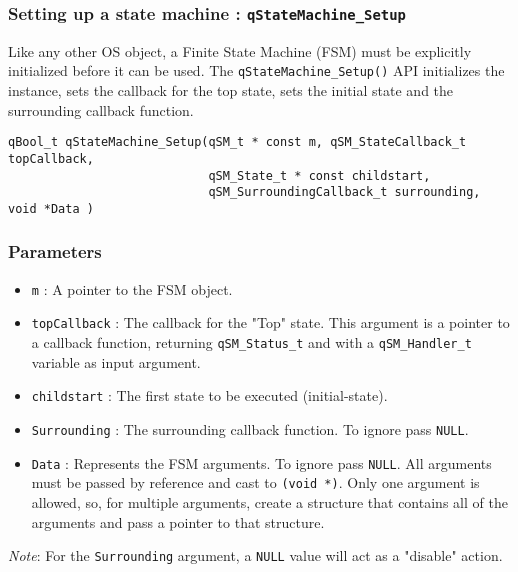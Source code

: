 \subsubsection{Setting up a state machine : \texorpdfstring{\lstinline{qStateMachine_Setup}}{qStateMachine_Setup} }
Like any other OS object, a Finite State Machine (FSM) must be explicitly initialized before it can be used. The \lstinline{qStateMachine_Setup()} API   initializes the instance, sets the callback for the top state, sets the initial state and the surrounding callback function.
\medskip

\begin{lstlisting}[style=CStyle]
qBool_t qStateMachine_Setup(qSM_t * const m, qSM_StateCallback_t topCallback, 
                            qSM_State_t * const childstart, 
                            qSM_SurroundingCallback_t surrounding, void *Data )
\end{lstlisting}

\subsubsection*{Parameters}
\begin{itemize}
    \item \lstinline{m} : A pointer to the FSM object.
    \item \lstinline{topCallback} :  The callback for the "Top" state. This argument is a pointer to a callback function, returning \lstinline{qSM_Status_t} and with a \lstinline{qSM_Handler_t} variable as input argument.
    \item \lstinline{childstart} : The first state to be executed (initial-state). 
    \item \lstinline{Surrounding} : The surrounding callback function. To ignore pass \lstinline{NULL}.
    \item \lstinline{Data} : Represents the FSM arguments. To ignore pass \lstinline{NULL}. All arguments must be passed by reference and cast to \lstinline{(void *)}. Only one argument is allowed, so, for multiple arguments, create a structure that contains all of the arguments and pass a pointer to that structure. 
\end{itemize}  

\begin{tcolorbox}
\ArrowBoldDownRight \textit{Note}: For the \lstinline{Surrounding} argument, a \lstinline{NULL} value will act as a "disable" action.
\end{tcolorbox}

